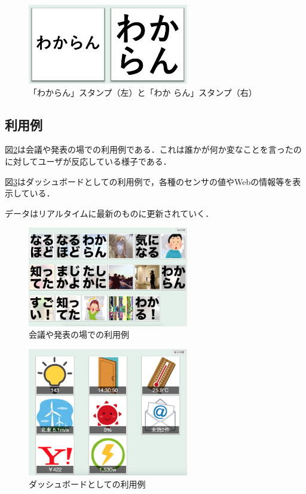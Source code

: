 \begin{figure}[h]
\centering
\includegraphics[width=7cm]{images/wakaran.png}
\caption{「わからん」スタンプ（左）と「わか らん」スタンプ（右）}
\label{wakaran}
\end{figure}

\subsection{利用例}
図\ref{discussion}は会議や発表の場での利用例である．これは誰かが何か変なことを言ったのに対してユーザが反応している様子である．

図\ref{sensors}はダッシュボードとしての利用例で，各種のセンサの値やWebの情報等を表示している．

データはリアルタイムに最新のものに更新されていく．

\begin{figure}[h]
\centering
\includegraphics[width=7cm]{images/discussion.png}
\caption{会議や発表の場での利用例}
\label{discussion}
\end{figure}

\begin{figure}[h]
\centering
\includegraphics[width=7cm]{images/sensors.png}
\caption{ダッシュボードとしての利用例}
\label{sensors}
\end{figure}
